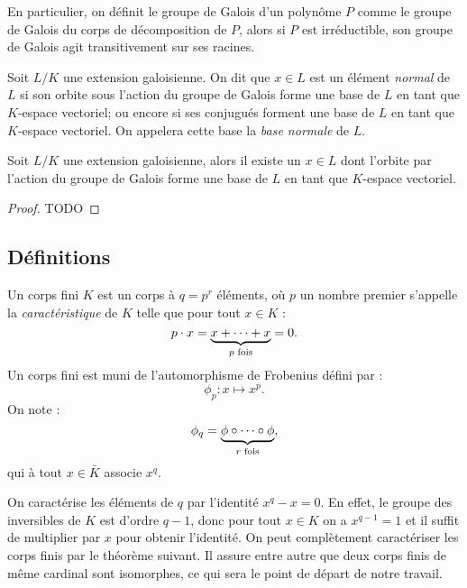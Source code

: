 \documentclass[a4paper]{article} %
\numberwithin{section}{part}
\numberwithin{equation}{section}
\begin{document}
\begin{rem}
En particulier, on définit le groupe de Galois d'un polynôme $P$ comme le
groupe de Galois du corps de décomposition de $P$, alors si $P$ est
irréductible, son groupe de Galois agit transitivement sur ses racines.
\end{rem}

\begin{defn}
\label{def:elemnorm}
Soit $L/K$ une extension galoisienne. On dit que $x\in L$ est un élément
\emph{normal} de $L$ si son orbite sous l'action du groupe de Galois forme une 
base de $L$ en tant que $K$-espace vectoriel; ou encore si ses conjugués forment
une base de $L$ en tant que $K$-espace vectoriel. On appelera cette base la 
\emph{base normale} de $L$.
\end{defn}

\begin{thm}
Soit $L/K$ une extension galoisienne, alors il existe un $x\in L$ dont l'orbite
par l'action du groupe de Galois forme une base de $L$ en tant que $K$-espace
vectoriel.
\end{thm}
\begin{proof}
TODO
\end{proof}

\subsection{Définitions}
Un corps fini $K$ est un corps à $q = p^r$ éléments, où $p$ un nombre premier
s'appelle la \emph{caractéristique} de $K$ telle que pour tout $x\in K$ :
\begin{equation}
p\cdot x = \underbrace{x+\dots+x}_{p\textup{ fois}} = 0.
\end{equation}
Un corps fini est muni de l'automorphisme de Frobenius défini par :
\begin{equation}
\phi_p : x \mapsto x^p.
\end{equation}
On note :
\begin{equation}
\phi_q = \underbrace{\phi\circ\cdots\circ\phi}_{r\textup{
fois}},
\end{equation}
qui à tout $x\in \bar{K}$ associe $x^q$.\par
On caractérise les éléments de $q$ par l'identité $x^q - x = 0$. En effet, le
groupe des inversibles de $K$ est d'ordre $q-1$, donc pour tout $x\in K$ on a
$x^{q-1} = 1$ et il suffit de multiplier par $x$ pour obtenir l'identité.
On peut complètement caractériser les corps finis par le théorème suivant. Il
assure entre autre que deux corps finis de même cardinal sont isomorphes, ce qui
sera le point de départ de notre travail.
\end{document}
